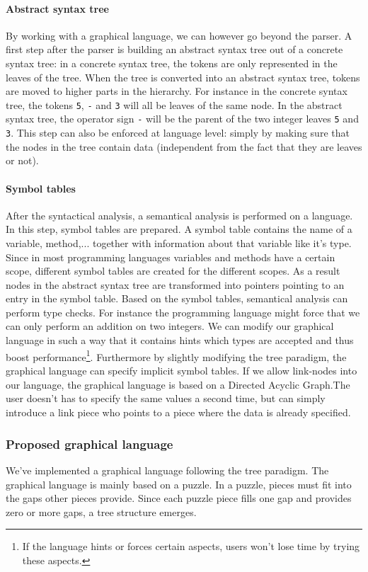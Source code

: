 \paragraph{Abstract syntax tree}
By working with a graphical language, we can however go beyond the parser. A
first step after the parser is building an abstract syntax tree out of a
concrete syntax tree: in a concrete syntax tree, the tokens are only
represented in the leaves of the tree. When the tree is converted into an
abstract syntax tree, tokens are moved to higher parts in the hierarchy. For
instance in the concrete syntax tree, the tokens \verb+5+, \verb+-+ and
\verb+3+ will all be leaves of the same node. In the abstract syntax tree, the
operator sign \verb+-+ will be the parent of the two integer leaves \verb+5+
and \verb+3+. This step can also be enforced at language level: simply by
making sure that the nodes in the tree contain data (independent from the fact
that they are leaves or not).
\paragraph{Symbol tables}
After the syntactical analysis, a semantical analysis is performed on a
language. In this step, symbol tables are prepared. A symbol table contains the
name of a variable, method,... together with information about that variable
like it's type. Since in most programming languages variables and methods have
a certain scope, different symbol tables are created for the different scopes.
As a result nodes in the abstract syntax tree are transformed into pointers
pointing to an entry in the symbol table. Based on the symbol tables,
semantical analysis can perform type checks. For instance the programming
language might force that we can only perform an addition on two integers. We
can modify our graphical language in such a way that it contains hints which
types are accepted and thus boost performance\footnote{If the language hints
or forces certain aspects, users won't lose time by trying these aspects.}.
Furthermore by slightly modifying the tree paradigm, the graphical language can
specify implicit symbol tables. If we allow link-nodes into our language, the
graphical language is based on a Directed Acyclic Graph.The user doesn't has to
specify the same values a second time, but can simply introduce a link piece
who points to a piece where the data is already specified.
\subparagraph{}
\subsubsection{Proposed graphical language}
We've implemented a graphical language following the tree paradigm. The
graphical language is mainly based on a puzzle. In a puzzle, pieces must fit
into the gaps other pieces provide. Since each puzzle piece fills one gap and
provides zero or more gaps, a tree structure emerges.

